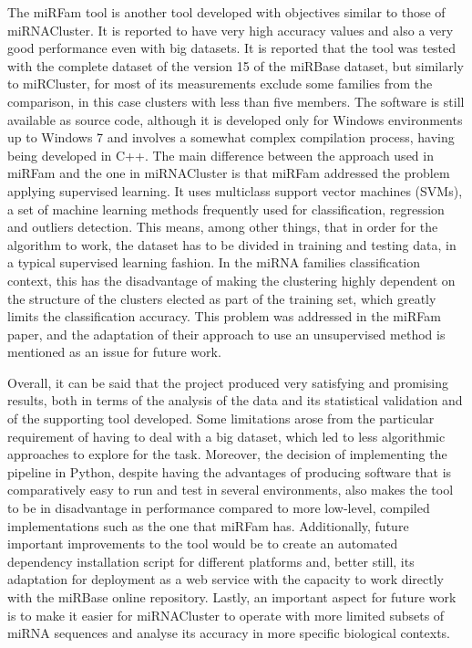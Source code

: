 \documentclass[nocrop]{bioinfo}
\begin{document}
The miRFam tool is another tool developed with objectives similar to those of miRNACluster. It is reported to have very high accuracy values and also a very good performance even with big datasets. It is reported that the tool was tested with the complete dataset of the version 15 of the miRBase dataset, but similarly to miRCluster, for most of its measurements exclude some families from the comparison, in this case clusters with less than five members. The software is still available as source code, although it is developed only for Windows environments up to Windows 7 and involves a somewhat complex compilation process, having being developed in C++. The main difference between the approach used in miRFam and the one in miRNACluster is that miRFam addressed the problem applying supervised learning. It uses multiclass support vector machines (SVMs), a set of machine learning methods frequently used for classification, regression and outliers detection. This means, among other things, that in order for the algorithm to work, the dataset has to be divided in training and testing data, in a typical supervised learning fashion. In the miRNA families classification context, this has the disadvantage of making the clustering highly dependent on the structure of the clusters elected as part of the training set, which greatly limits the classification accuracy. This problem was addressed in the miRFam paper, and the adaptation of their approach to use an unsupervised method is mentioned as an issue for future work.

Overall, it can be said that the project produced very satisfying and promising results, both in terms of the analysis of the data and its statistical validation and of the supporting tool developed. Some limitations arose from the particular requirement of having to deal with a big dataset, which led to less algorithmic approaches to explore for the task. Moreover, the decision of implementing the pipeline in Python, despite having the advantages of producing software that is comparatively easy to run and test in several environments, also makes the tool to be in disadvantage in performance compared to more low-level, compiled implementations such as the one that miRFam has. Additionally, future important improvements to the tool would be to create an automated dependency installation script for different platforms and, better still, its adaptation for deployment as a web service with the capacity to work directly with the miRBase online repository. Lastly, an important aspect for future work is to make it easier for miRNACluster to operate with more limited subsets of miRNA sequences and analyse its accuracy in more specific biological contexts.
\end{document}
